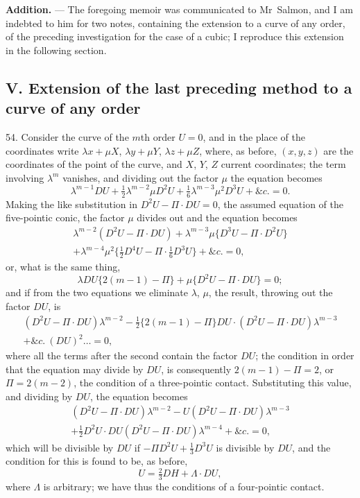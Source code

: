 \documentclass[11pt,a4paper]{book}
\begin{document}
\vspace{6pt}
\noindent\textbf{Addition.} --- The foregoing memoir was communicated to Mr~Salmon, and I am indebted to him for two notes, containing the extension to a curve of any order, of the preceding investigation for the case of a cubic; I reproduce this extension in the following section.

\subsection*{V. Extension of the last preceding method to a curve of any order}

54. Consider the curve of the $m$th order $U=0$, and in the place of the coordinates write $\lambda x+\mu X$, $\lambda y+\mu Y$, $\lambda z+\mu Z$, where, as before, $(x,y,z)$ are the coordinates of the point of the curve, and $X$, $Y$, $Z$ current coordinates; the term involving $\lambda^m$ vanishes, and dividing out the factor $\mu$ the equation becomes
\[
\lambda^{m-1}DU+\tfrac{1}{2}\lambda^{m-2}\mu D^2U+\tfrac{1}{6}\lambda^{m-3}\mu^2D^3U+\&c.=0.
\]
Making the like substitution in $D^2U-\Pi\cdot DU=0$, the assumed equation of the five-pointic conic, the factor $\mu$ divides out and the equation becomes
\begin{multline*}
\lambda^{m-2}(D^2U-\Pi\cdot DU)+\lambda^{m-3}\mu\{D^3U-\Pi\cdot D^2U\}\\
+\lambda^{m-4}\mu^2\{\tfrac{1}{2}D^4U-\Pi\cdot\tfrac{1}{6}D^3U\}+\&c.=0,
\end{multline*}
or, what is the same thing,
\[
\lambda DU\{2(m-1)-\Pi\}+\mu\{D^2U-\Pi\cdot DU\}=0;
\]
and if from the two equations we eliminate $\lambda$, $\mu$, the result, throwing out the factor $DU$, is
\begin{multline*}
(D^2U-\Pi\cdot DU)\lambda^{m-2}-\tfrac{1}{2}\{2(m-1)-\Pi\}DU\cdot(D^2U-\Pi\cdot DU)\lambda^{m-3}\\
+\&c.\ (DU)^2\ldots=0,
\end{multline*}
where all the terms after the second contain the factor $DU$; the condition in order that the equation may divide by $DU$, is consequently $2(m-1)-\Pi=2$, or $\Pi=2(m-2)$, the condition of a three-pointic contact. Substituting this value, and dividing by $DU$, the equation becomes
\begin{multline*}
(D^2U-\Pi\cdot DU)\lambda^{m-2}-U(D^2U-\Pi\cdot DU)\lambda^{m-3}\\
+\tfrac{1}{2}D^2U\cdot DU(D^2U-\Pi\cdot DU)\lambda^{m-4}+\&c.=0,
\end{multline*}
which will be divisible by $DU$ if $-\Pi D^2U+\tfrac{1}{3}D^3U$ is divisible by $DU$, and the condition for this is found to be, as before,
\[
U=\tfrac{2}{3}DH+\Lambda\cdot DU,
\]
where $\Lambda$ is arbitrary; we have thus the conditions of a four-pointic contact.
\end{document}
